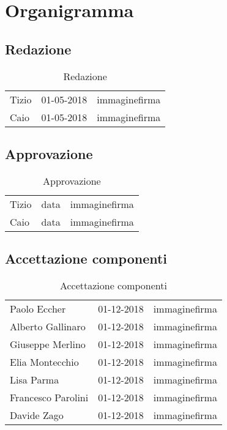 \appendix
\section{Organigramma}
	\subsection{Redazione}
	\begin{table}[H]
	\centering
	\begin{tabular}{|p{4cm}|C{4cm}|C{5cm}|}
	\hline
		 & & \\
		\hline			
		Tizio & 01-05-2018 & immaginefirma  \\
		\hline
		Caio & 01-05-2018 & immaginefirma \\
		\hline
	\end{tabular}
	\caption{Redazione}
	\end{table}
	
	\subsection{Approvazione}
	\begin{table}[H]
		\centering
		\begin{tabular}{|p{4cm}|C{4cm}|C{5cm}|}
			\hline
			 & & \\
			\hline			
			Tizio & data & immaginefirma  \\
			\hline
			Caio & data & immaginefirma \\
			\hline
		\end{tabular}
		\caption{Approvazione}
	\end{table}
	
	\subsection{Accettazione componenti}
		\begin{table}[H]
		\centering
		\begin{tabular}{|p{4cm}|C{4cm}|C{5cm}|}
			\hline
			 & & \\
			\hline			
			Paolo Eccher & 01-12-2018 & immaginefirma  \\
			\hline
			Alberto Gallinaro & 01-12-2018 & immaginefirma \\
			\hline
			Giuseppe Merlino & 01-12-2018 & immaginefirma \\
			\hline
			Elia Montecchio & 01-12-2018 & immaginefirma \\
			\hline
			Lisa Parma & 01-12-2018 & immaginefirma \\
			\hline
			Francesco Parolini & 01-12-2018 & immaginefirma \\
			\hline
			Davide Zago & 01-12-2018 & immaginefirma \\
			\hline
		\end{tabular}
		\caption{Accettazione componenti}
	\end{table}

